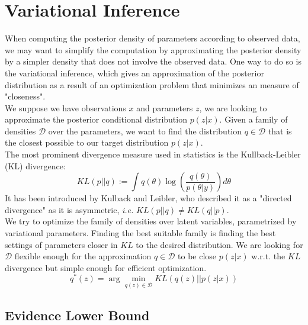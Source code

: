 \section{Variational Inference}
When computing the posterior density of parameters according to observed data, we may want to simplify the computation by approximating the posterior density by a simpler density that does not involve the observed data. One way to do so is the variational inference, which gives an approximation of the posterior distribution as a result of an optimization problem that minimizes an measure of "closeness".\\
\newline
We suppose we have observations $x$ and parameters $z$, we are looking to approximate the posterior conditional distribution $p(z|x)$. Given a family of densities $\mathcal{D}$ over the parameters, we want to find the distribution $q \in \mathcal{D}$ that is the closest possible to our target distribution $p(z|x)$.\\
\newline
The most prominent divergence measure used in statistics is the Kullback-Leibler (KL) divergence:
\begin{equation}
KL(p||q) := \int q(\theta)\log\left(\frac{q(\theta)}{p(\theta|y)}\right) d\theta
\label{eq:KL_div}
\end{equation}
It has been introduced by Kulback and Leibler, who described it as a "directed divergence" as it is asymmetric, \textit{i.e. }$KL(p||q) \neq KL(q||p)$.\\
\newline
We try to optimize the family of densities over latent variables, parametrized by variational parameters. Finding the best suitable family is finding the best settings of parameters closer in $KL$ to the desired distribution. We are looking for $\mathcal{D}$ flexible enough for the approximation $q \in \mathcal{D}$ to be close $p(z|x)$ w.r.t. the $KL$ divergence but simple enough for efficient optimization.\\

\begin{equation}
q^*(z) = \arg\min_{q(z) \in \mathcal{D}} KL(q(z)||p(z|x))
\label{eq:best_q}
\end{equation}

\subsection{Evidence Lower Bound}

